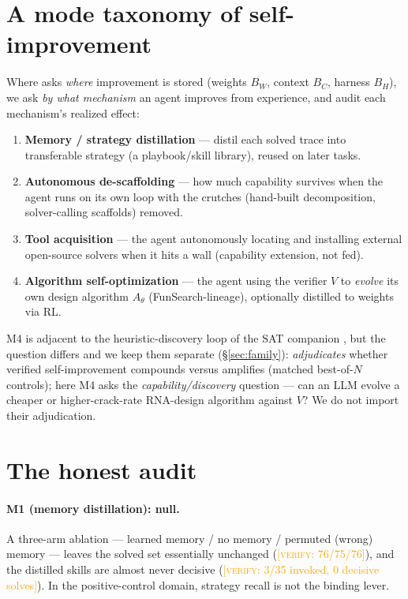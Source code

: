 \documentclass[11pt]{article}
\newcommand{\verify}[1]{\textcolor{orange}{[\textsc{verify}: #1]}}
\begin{document}
\section{A mode taxonomy of self-improvement}\label{sec:taxonomy}
Where \citet{determinismmanifold} asks \emph{where} improvement is stored (weights $B_W$, context
$B_C$, harness $B_H$), we ask \emph{by what mechanism} an agent improves from experience, and audit
each mechanism's realized effect:
\begin{enumerate}
\item[M1] \textbf{Memory / strategy distillation} --- distil each solved trace into transferable
  strategy (a playbook/skill library), reused on later tasks.
\item[M2] \textbf{Autonomous de-scaffolding} --- how much capability survives when the agent runs on
  its own loop with the crutches (hand-built decomposition, solver-calling scaffolds) removed.
\item[M3] \textbf{Tool acquisition} --- the agent autonomously locating and installing external
  open-source solvers when it hits a wall (capability extension, not fed).
\item[M4] \textbf{Algorithm self-optimization} --- the agent using the verifier $V$ to \emph{evolve}
  its own design algorithm $A_\theta$ (FunSearch-lineage), optionally distilled to weights via RL.
\end{enumerate}
M4 is adjacent to the heuristic-discovery loop of the SAT companion \citep{compoundingprofile}, but
the question differs and we keep them separate (\S\ref{sec:family}): \citet{compoundingprofile}
\emph{adjudicates} whether verified self-improvement compounds versus amplifies (matched best-of-$N$
controls); here M4 asks the \emph{capability/discovery} question --- can an LLM evolve a cheaper or
higher-crack-rate RNA-design algorithm against $V$? We do not import their adjudication.

\section{The honest audit}\label{sec:audit}
\paragraph{M1 (memory distillation): null.} A three-arm ablation --- learned memory / no memory /
permuted (wrong) memory --- leaves the solved set essentially unchanged (\verify{76/75/76}), and the
distilled skills are almost never decisive (\verify{3/35 invoked, 0 decisive solves}). In the
positive-control domain, strategy recall is not the binding lever.
\end{document}
